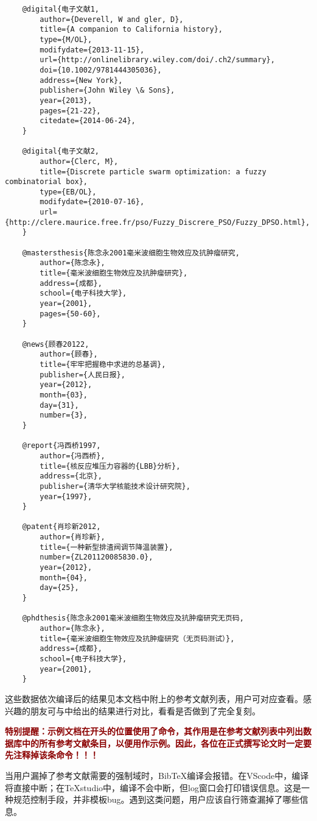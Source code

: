 \documentclass[print, doctor, vlined]{DissertUESTC}
\begin{document}
\begin{verbatim}
	@digital{电子文献1,
	    author={Deverell, W and gler, D},
	    title={A companion to California history},
	    type={M/OL},
	    modifydate={2013-11-15},
	    url={http://onlinelibrary.wiley.com/doi/.ch2/summary},
	    doi={10.1002/9781444305036},
	    address={New York},
	    publisher={John Wiley \& Sons},
	    year={2013},
	    pages={21-22},
	    citedate={2014-06-24},
	}
	
	@digital{电子文献2,
	    author={Clerc, M},
	    title={Discrete particle swarm optimization: a fuzzy combinatorial box},
	    type={EB/OL},
	    modifydate={2010-07-16},
	    url={http://clere.maurice.free.fr/pso/Fuzzy_Discrere_PSO/Fuzzy_DPSO.html},
	}
	
	@mastersthesis{陈念永2001毫米波细胞生物效应及抗肿瘤研究,
	    author={陈念永},
	    title={毫米波细胞生物效应及抗肿瘤研究},
	    address={成都},
	    school={电子科技大学},
	    year={2001},
	    pages={50-60},
	}
	
	@news{顾春20122,
	    author={顾春},
	    title={牢牢把握稳中求进的总基调},
	    publisher={人民日报},
	    year={2012},
	    month={03},
	    day={31},
	    number={3},
	}
	
	@report{冯西桥1997,
	    author={冯西桥},
	    title={核反应堆压力容器的{LBB}分析},
	    address={北京},
	    publisher={清华大学核能技术设计研究院},
	    year={1997},
	}
	
	@patent{肖珍新2012,
	    author={肖珍新},
	    title={一种新型排渣阀调节降温装置},
	    number={ZL201120085830.0},
	    year={2012},
	    month={04},
	    day={25},
	}

	@phdthesis{陈念永2001毫米波细胞生物效应及抗肿瘤研究无页码,
	    author={陈念永},
	    title={毫米波细胞生物效应及抗肿瘤研究（无页码测试）},
	    address={成都},
	    school={电子科技大学},
	    year={2001},
	}
	\end{verbatim}
	
	这些数据依次编译后的结果见本文档中附上的参考文献列表，用户可对应查看。感兴趣的朋友可与\href{https://gr.uestc.edu.cn/xiazai/114/3917}{}中给出的结果进行对比，看看是否做到了完全复刻。

	\textbf{\textcolor{DarkRed}{特别提醒：示例文档在开头的位置使用了命令，其作用是在参考文献列表中列出数据库中的所有参考文献条目，以便用作示例。因此，各位在正式撰写论文时一定要先注释掉该条命令！！！}}

	当用户漏掉了参考文献需要的强制域时，BibTeX编译会报错。在VScode中，编译将直接中断；在TeXstudio中，编译不会中断，但log窗口会打印错误信息。这是一种规范控制手段，并非模板bug。遇到这类问题，用户应该自行筛查漏掉了哪些信息。
	
\end{document}
